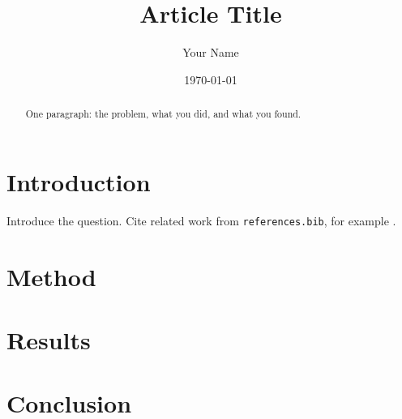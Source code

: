\documentclass[11pt]{article}
\title{Article Title}
\author{Your Name}
\date{\today}
\begin{document}
\maketitle

\begin{abstract}
One paragraph: the problem, what you did, and what you found.
\end{abstract}

\section{Introduction}
\label{sec:introduction}

Introduce the question. Cite related work from \texttt{references.bib}, for example
\citet{lamport1994latex}.

\section{Method}
\label{sec:method}

\section{Results}
\label{sec:results}

\section{Conclusion}
\label{sec:conclusion}



\end{document}
